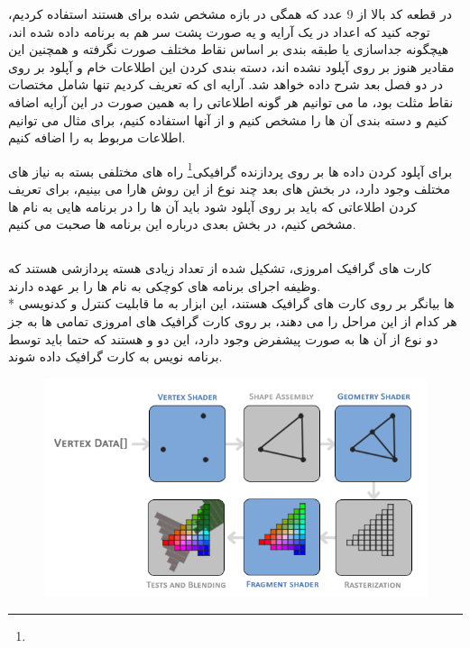 \documentclass[a4paper, 12pt]{report}
\newcommand{\lrit}[1]{\lr{\textit{#1}}}
\begin{document}
     در قطعه کد بالا از 9 عدد که همگی در بازه مشخص شده برای  هستند استفاده کردیم، توجه کنید که اعداد در یک آرایه و یه صورت پشت سر هم به برنامه داده شده اند، هیچگونه جداسازی یا طبقه بندی بر اساس نقاط مختلف صورت نگرفته و همچنین این مقادیر هنوز بر روی  آپلود نشده اند، دسته بندی کردن این اطلاعات خام و آپلود بر روی  در دو فصل بعد شرح داده خواهد شد.
     آرایه ای که تعریف کردیم تنها شامل مختصات نقاط مثلت بود، ما می توانیم هر گونه اطلاعاتی را به همین صورت در این آرایه اضافه کنیم و دسته بندی آن ها را مشخص کنیم و از آنها استفاده کنیم، برای مثال می توانیم اطلاعات مربوط به  را اضافه کنیم.\par
     برای آپلود کردن داده ها بر روی پردازنده گرافیکی\footnote{} راه های مختلفی بسته به نیاز های مختلف وجود دارد، در بخش های بعد چند نوع از این روش هارا می بینیم، برای تعریف کردن اطلاعاتی که باید بر روی  آپلود شود باید آن ها را در برنامه هایی به نام  ها مشخص کنیم، در بخش بعدی درباره این برنامه ها صحبت می کنیم.


\newpage
\subsection{}
\noindent
\normalsize
    کارت های گرافیک امروزی، تشکیل شده از تعداد زیادی هسته پردازشی هستند که وظیفه اجرای برنامه های کوچکی به نام \lrit{Shader} ها را بر عهده دارند.\\*
     ها بیانگر  بر روی کارت های گرافیک هستند، این ابزار به ما قابلیت کنترل و کدنویسی هر کدام از این مراحل را می دهند، بر روی کارت گرافیک های امروزی
    تمامی  ها به جز دو نوع از آن ها به صورت پیشفرض وجود دارد، این دو  و  هستند که حتما باید توسط برنامه نویس به کارت گرافیک داده شوند.

\vspace*{0.6cm}
\begin{figure}[ht]
    \centering
    \href{https://learnopengl.com}{
        \includegraphics[width=12cm]{pipeline.png}
    }
    \caption{\fontsize{11pt}{1.0cm}\zarbold\textbf{}}
    \label{fig:my_label}
\end{figure}
\vspace*{0.6cm}
\end{document}
